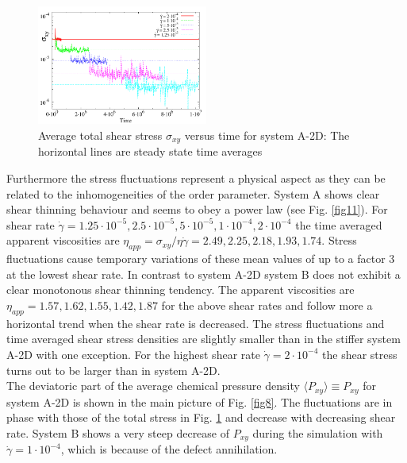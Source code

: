\documentclass[8.5pt,twoside,twocolumn]{article}
\newcommand{\e}[1]{\cdot10^{#1}}
\newcommand{\gd}{\dot{\gamma}}
\begin{document}
\begin{figure}[htp!]
\centering
\includegraphics[angle=0,width=0.5\textwidth]{S_xy_tot_t_5e-4.pdf}
\caption{Average total shear stress $\sigma_{xy}$ versus time for system A-2D: The horizontal lines are steady state time averages}
\label{fig7}
\end{figure}

Furthermore the stress fluctuations represent a physical aspect as they can be related to the inhomogeneities of the order parameter.
System A shows clear shear thinning behaviour and seems to obey a power law (see Fig. \ref{fig11}).
For shear rate $\dot{\gamma}=1.25\e{-5}, 2.5\e{-5}, 5\e{-5}, 1\e{-4}, 2\e{-4}$ the time averaged apparent viscosities are $\eta_{app}=\sigma_{xy}/ \eta \dot{\gamma}=2.49, 2.25, 2.18, 1.93, 1.74$.
Stress fluctuations cause temporary variations of these mean values of up to a factor 3 at the lowest shear rate.
In contrast to system A-2D system B does not exhibit a clear monotonous shear thinning tendency.
The apparent viscosities are $\eta_{app}=1.57, 1.62, 1.55, 1.42, 1.87$ for the above shear rates and follow more a horizontal trend when the shear rate is decreased.
The stress fluctuations and time averaged shear stress densities are slightly smaller than in the stiffer system A-2D with one exception.
For the highest shear rate $\gd=2\e{-4}$ the shear stress turns out to be larger than in system A-2D.\\
The deviatoric part of the average chemical pressure density $\langle P_{xy}\rangle\equiv P_{xy}$ for system A-2D is shown in the main picture of Fig. \ref{fig8}.
The fluctuations are in phase with those of the total stress in Fig. \ref{fig7} and decrease with decreasing shear rate.
System B shows a very steep decrease of $P_{xy}$ during the simulation with $\gd=1\e{-4}$, which is because of the defect annihilation.\\
\end{document}
